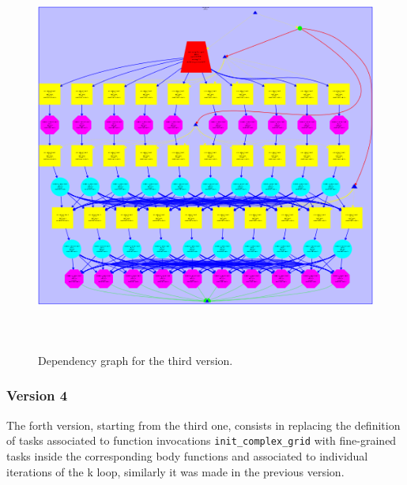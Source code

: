 \documentclass[12]{article}
\begin{document}
\begin{figure}[H]
\centering  \includegraphics[width=\linewidth , height=13cm, width=13cm  ]{images/dependency_graph3.png}
  \caption{Dependency graph for the third version.}
  \label{fig:Depencency3rd}
\end{figure}

\subsubsection{Version 4}
The forth version, starting from the third one, consists in replacing the definition of tasks associated to function invocations \texttt{init\_complex\_grid}  with fine-grained tasks inside the corresponding body functions and associated to individual iterations of the k loop, similarly it was made in the previous version. 
\end{document}
